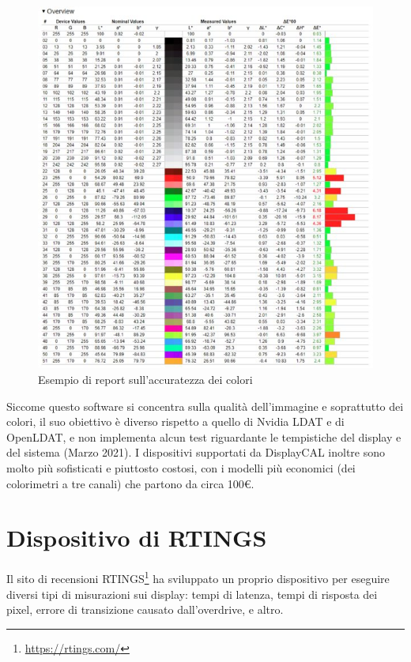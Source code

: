 \begin{figure}[h]
	\centering
	\includegraphics[width=\textwidth]{StatoDellArte_files/displaycal_report_example.jpg}
	\caption{Esempio di report sull'accuratezza dei colori}
	\label{fig:displaycal_report_example}
\end{figure}

Siccome questo software si concentra sulla qualità dell'immagine e soprattutto dei colori, il suo obiettivo è diverso rispetto a quello di Nvidia LDAT e di OpenLDAT, e non implementa alcun test riguardante le tempistiche del display e del sistema (Marzo 2021). I dispositivi supportati da DisplayCAL inoltre sono molto più sofisticati e piuttosto costosi, con i modelli più economici (dei colorimetri a tre canali) che partono da circa 100€.

\section{Dispositivo di RTINGS}
Il sito di recensioni RTINGS\footnote{\href{https://rtings.com/}{https://rtings.com/}} ha sviluppato un proprio dispositivo per eseguire diversi tipi di misurazioni sui display: tempi di latenza, tempi di risposta dei pixel, errore di transizione causato dall'overdrive, e altro.

